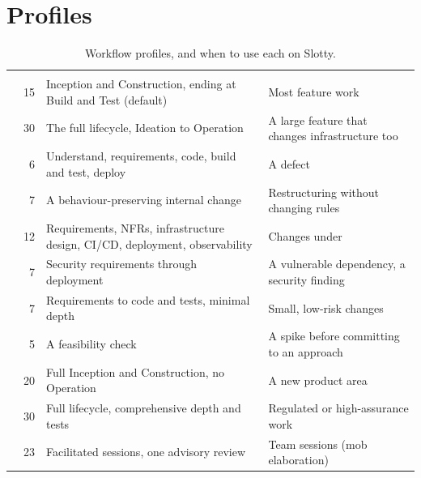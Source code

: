 \section{Profiles}
{\tablefont
\begin{xltabular}{\linewidth}{@{}l r L L@{}}
  \caption{Workflow profiles, and when to use each on Slotty.}\label{tab:aidlc-profiles}\\
  \toprule
   &  &  & \\
  \midrule
  \endfirsthead
  \toprule
   &  &  & \\
  \midrule
  \endhead
   & 15 & Inception and Construction, ending at Build and Test (default) & Most feature work\\
   & 30 & The full lifecycle, Ideation to Operation & A large feature that changes infrastructure too\\
   & 6 & Understand, requirements, code, build and test, deploy & A defect\\
   & 7 & A behaviour-preserving internal change & Restructuring without changing rules\\
   & 12 & Requirements, NFRs, infrastructure design, CI/CD, deployment, observability & Changes under \\
   & 7 & Security requirements through deployment & A vulnerable dependency, a security finding\\
   & 7 & Requirements to code and tests, minimal depth & Small, low-risk changes\\
   & 5 & A feasibility check & A spike before committing to an approach\\
   & 20 & Full Inception and Construction, no Operation & A new product area\\
   & 30 & Full lifecycle, comprehensive depth and tests & Regulated or high-assurance work\\
   & 23 & Facilitated sessions, one advisory review & Team sessions (mob elaboration)\\
  \bottomrule
\end{xltabular}}

